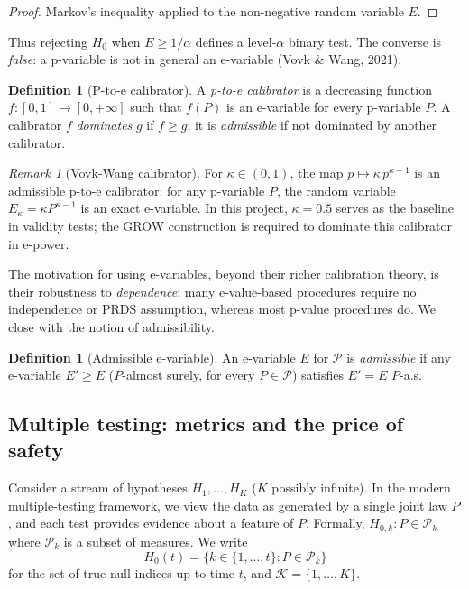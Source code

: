 \documentclass[11pt,a4paper,twocolumn]{article}
\theoremstyle{plain}
\theoremstyle{definition}
\newtheorem{definition}[theorem]{Definition}
\theoremstyle{remark}
\newtheorem{remark}[theorem]{Remark}
\begin{document}
\begin{proof}
Markov's inequality applied to the non-negative random variable $E$.
\end{proof}

Thus rejecting $H_0$ when $E \ge 1/\alpha$ defines a level-$\alpha$ binary
test. The converse is \emph{false}: a p-variable is not in general an
e-variable (Vovk \& Wang, 2021).

\begin{definition}[P-to-e calibrator]
A \emph{p-to-e calibrator} is a decreasing function $f : [0,1] \to [0,+\infty]$
such that $f(P)$ is an e-variable for every p-variable $P$. A calibrator $f$
\emph{dominates} $g$ if $f \geq g$; it is \emph{admissible} if not dominated
by another calibrator.
\end{definition}

\begin{remark}[Vovk-Wang calibrator]
For $\kappa \in (0,1)$, the map $p \mapsto \kappa\,p^{\kappa-1}$ is an
admissible p-to-e calibrator: for any p-variable $P$, the random variable
$E_\kappa = \kappa P^{\kappa-1}$ is an exact e-variable. In this project,
$\kappa = 0.5$ serves as the baseline in validity tests;
the GROW construction is required to dominate this calibrator in e-power.
\end{remark}

The motivation for using e-variables, beyond their richer calibration theory,
is their robustness to \emph{dependence}: many e-value-based procedures
require no independence or PRDS assumption, whereas most p-value procedures
do. We close with the notion of admissibility.

\begin{definition}[Admissible e-variable]
An e-variable $E$ for $\mathcal{P}$ is \emph{admissible} if any e-variable
$E' \geq E$ ($P$-almost surely, for every $P \in \mathcal{P}$) satisfies
$E' = E$ $P$-a.s.
\end{definition}

\subsection{Multiple testing: metrics and the price of safety}
\label{sec:metrics}

Consider a stream of hypotheses $H_1, \ldots, H_K$ ($K$ possibly infinite).
In the modern multiple-testing framework, we view the data as generated by a
single joint law $P$, and each test provides evidence about a feature of
$P$. Formally, $H_{0,k} : P \in \mathcal{P}_k$ where $\mathcal{P}_k$ is a
subset of measures. We write
\[
  H_0(t) = \{k \in \{1, \ldots, t\} : P \in \mathcal{P}_k\}
\]
for the set of true null indices up to time $t$, and $\mathcal{K} = \{1,
\ldots, K\}$.
\end{document}

